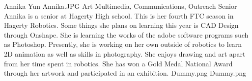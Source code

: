 \insertbio
{Annika Yun}
{Annika.JPG}
{Art}
{Multimedia, Communications, Outreach}
{Senior}
{
Annika is a senior at Hagerty High school. This is her fourth FTC season in Hagerty Robotics. Some things she plans on learning this year is CAD Design through Onshape. She is learning the works of the adobe software programs such as Photoshop. Presently, she is working on her own outside of robotics to learn 2D animation as well as skills in photography.  She enjoys drawing and art apart from her time spent in robotics. She has won a Gold Medal National Award through her artwork and participated in an exhibition.
}
{Dummy.png}
{Dummy.png}
